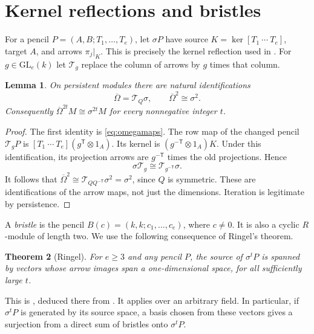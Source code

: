 \documentclass[11pt]{article}
\newtheorem{theorem}{Theorem}[section]
\newtheorem{lemma}[theorem]{Lemma}
\theoremstyle{definition}\newtheorem{definition}[theorem]{Definition}
\theoremstyle{remark}\newtheorem{remark}[theorem]{Remark}
\newcommand{\Om}{\overline\Omega}
\begin{document}
\section{Kernel reflections and bristles}
For a pencil $P=(A,B;T_1,\ldots,T_e)$, let $\sigma P$ have source $K=\ker[T_1\ \cdots\ T_e]$, target $A$, and arrows $\pi_j|_K$. This is precisely the kernel reflection used in \cite[Section 5]{RP}. For $g\in\mathrm{GL}_e(k)$ let $\mathcal T_g$ replace the column of arrows by $g$ times that column.

\begin{lemma}\label{lem:reflection}
On persistent modules there are natural identifications
\begin{equation}\label{eq:reflection}
 \Om=\mathcal T_Q\sigma,
 \qquad \Om^2\cong\sigma^2.
\end{equation}
Consequently $\Om^{2t}M\cong\sigma^{2t}M$ for every nonnegative integer $t$.
\end{lemma}
\begin{proof}
The first identity is \eqref{eq:omegamaps}. The row map of the changed pencil $\mathcal T_gP$ is $[T_1\ \cdots\ T_e](g^{\mathsf T}\otimes1_A)$. Its kernel is $(g^{-\mathsf T}\otimes1_A)K$. Under this identification, its projection arrows are $g^{-\mathsf T}$ times the old projections. Hence
\[
 \sigma\mathcal T_g\cong\mathcal T_{g^{-\mathsf T}}\sigma.
\]
It follows that $\Om^2\cong\mathcal T_{Q Q^{-\mathsf T}}\sigma^2=\sigma^2$, since $Q$ is symmetric. These are identifications of the arrow maps, not just the dimensions. Iteration is legitimate by persistence.
\end{proof}

A \emph{bristle} is the pencil $B(c)=(k,k;c_1,\ldots,c_e)$, where $c\ne0$. It is also a cyclic $R$-module of length two. We use the following consequence of Ringel's theorem.

\begin{theorem}[Ringel]\label{thm:ringel}
For $e\ge3$ and any pencil $P$, the source of $\sigma^tP$ is spanned by vectors whose arrow images span a one-dimensional space, for all sufficiently large $t$.
\end{theorem}

This is \cite[Section 5, Theorem 2]{RP}, deduced there from \cite{RB}. It applies over an arbitrary field. In particular, if $\sigma^tP$ is generated by its source space, a basis chosen from these vectors gives a surjection from a direct sum of bristles onto $\sigma^tP$.
\end{document}
